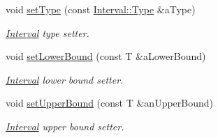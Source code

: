 \begin{DoxyCompactItemize}
void \hyperlink{classlibrary_1_1math_1_1obj_1_1_interval_a4dfb117d5a9c23bd32a3631fcf3686ec}{set\+Type} (const \hyperlink{classlibrary_1_1math_1_1obj_1_1_interval_base_aabce6fa07a6e2e8fd3fcab5fd0d317d6}{Interval\+::\+Type} \&a\+Type)
\begin{DoxyCompactList}\small\item\em \hyperlink{classlibrary_1_1math_1_1obj_1_1_interval}{Interval} type setter. \end{DoxyCompactList}\item 
void \hyperlink{classlibrary_1_1math_1_1obj_1_1_interval_a5ceb8fb56f920193c8b18346992b5d02}{set\+Lower\+Bound} (const T \&a\+Lower\+Bound)
\begin{DoxyCompactList}\small\item\em \hyperlink{classlibrary_1_1math_1_1obj_1_1_interval}{Interval} lower bound setter. \end{DoxyCompactList}\item 
void \hyperlink{classlibrary_1_1math_1_1obj_1_1_interval_a9c6b857d9fad97969635f669428c2b48}{set\+Upper\+Bound} (const T \&an\+Upper\+Bound)
\begin{DoxyCompactList}\small\item\em \hyperlink{classlibrary_1_1math_1_1obj_1_1_interval}{Interval} upper bound setter. \end{DoxyCompactList}\end{DoxyCompactItemize}
